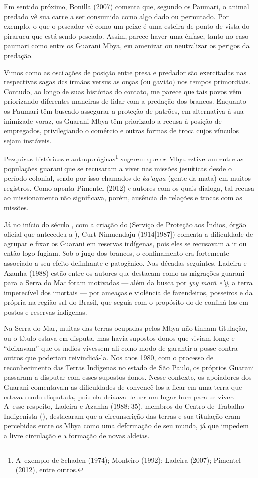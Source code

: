 Em sentido próximo, Bonilla (2007) comenta que, segundo os Paumari, o
animal predado vê sua carne a ser consumida como algo dado ou
permutado. Por exemplo, o que o pescador vê como um peixe é uma esteira
do ponto de vista do pirarucu que está sendo pescado. Assim, parece
haver uma ênfase, tanto no caso paumari como entre os Guarani Mbya, em
amenizar ou neutralizar os perigos da predação. 

Vimos como as oscilações de posição entre presa e predador são
exercitadas nas respectivas sagas dos irmãos versus as onças (ou
gavião) nos tempos primordiais. Contudo, ao longo de suas histórias do
contato, me parece que tais povos vêm priorizando diferentes maneiras
de lidar com a predação dos brancos. Enquanto os Paumari têm buscado
assegurar a proteção de patrões, em alternativa à sua inimizade voraz,
os Guarani Mbya têm priorizado a recusa à posição de empregados,
privilegiando o comércio e outras formas de troca cujos vínculos sejam
instáveis.

Pesquisas históricas e antropológicas\footnote{A~exemplo de Schaden
(1974); Monteiro (1992); Ladeira (2007); Pimentel (2012), entre
outros.} sugerem que os Mbya estiveram entre as populações guarani que
se recusaram a viver nas missões jesuíticas desde o período colonial,
sendo por isso chamados de \emph{ka’agua} (gente da mata) em muitos registros.
Como aponta Pimentel (2012) e autores com os quais dialoga, tal recusa
ao missionamento não significava, porém, ausência de relações e trocas
com as missões.

Já no início do século , com a criação do  (Serviço de Proteção aos
Índios, órgão oficial que antecedeu a ), Curt Nimuendaju
(1914[1987]) comenta a dificuldade de agrupar e fixar os Guarani em
reservas indígenas, pois eles se recusavam a ir ou então logo fugiam.
Sob o jugo dos brancos, o confinamento era fortemente associado a seu
efeito definhante e patogênico. Nas décadas seguintes, Ladeira e Azanha
(1988) estão entre os autores que destacam como as migrações guarani
para a Serra do Mar foram motivadas --- além da busca por \emph{yvy marã
e’\~{y}}, a terra imperecível dos imortais --- por ameaças e violência de
fazendeiros, posseiros e da própria  na região sul do Brasil, que
seguia com o propósito do  de confiná-los em postos e reservas
indígenas.

Na Serra do Mar, muitas das terras ocupadas pelos Mbya não tinham
titulação, ou o título estava em disputa, mas havia supostos donos que
viviam longe e ``deixavam'' que os índios vivessem ali como modo de
garantir a posse contra outros que poderiam reivindicá-la. Nos anos
1980, com o processo de reconhecimento das Terras Indígenas no estado
de São Paulo, os próprios Guarani passaram a disputar com esses
supostos donos. Nesse contexto, os apoiadores dos Guarani comentavam as
dificuldades de convencê-los a ficar em uma terra que estava sendo
disputada, pois ela deixava de ser um lugar bom para se viver. A~esse
respeito, Ladeira e Azanha (1988: 35), membros do Centro de Trabalho
Indigenista (), destacaram que a circunscrição das terras e sua
titulação eram percebidas entre os Mbya como uma deformação de seu
mundo, já que impedem a livre circulação e a formação de novas aldeias.

